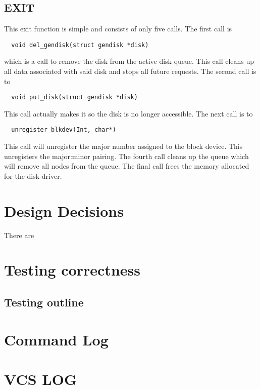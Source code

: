 \documentclass[onecolumn, draftclsnofoot,10pt, compsoc]{IEEEtran}
\begin{document}
    \subsection{EXIT}
    
    This exit function is simple and consists of only five calls. The first call is \begin{verbatim}  void del_gendisk(struct gendisk *disk) \end{verbatim} which is a call to remove the disk from the active disk queue. This call cleans up all data associated with said disk and stops all future requests. The second call is to \begin{verbatim}  void put_disk(struct gendisk *disk) \end{verbatim} This call actually makes it so the disk is no longer accessible. The next call is to \begin{verbatim}  unregister_blkdev(Int, char*) \end{verbatim} This call will unregister the major number assigned to the block device. This unregisters the major:minor pairing. The fourth call cleans up the queue which will remove all nodes from the queue. The final call frees the memory allocated for the disk driver.

	\section{Design Decisions}
    
    There are 

	\section{Testing correctness}

	\subsection{Testing outline}

	\section{Command Log}

	\section{VCS LOG}

        
\end{document}
